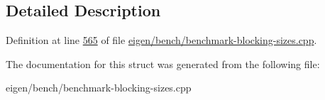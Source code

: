 \subsection{Detailed Description}


Definition at line \hyperlink{eigen_2bench_2benchmark-blocking-sizes_8cpp_source_l00565}{565} of file \hyperlink{eigen_2bench_2benchmark-blocking-sizes_8cpp_source}{eigen/bench/benchmark-\/blocking-\/sizes.\+cpp}.



The documentation for this struct was generated from the following file\+:\begin{DoxyCompactItemize}
\item 
eigen/bench/benchmark-\/blocking-\/sizes.\+cpp\end{DoxyCompactItemize}
